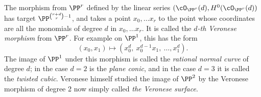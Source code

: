 %
%
%
%

\begin{example}\label{Veronese definition}
The morphism from $\PP^r$ defined by the  linear series $(\cO_{\PP^r}(d), H^0(\cO_{\PP^r}(d))$ has target
$\PP^{{r+d\choose r}-1}$, and takes a point $x_0,\dots x_r$ to the point whose coordinates are all the monomials of
degree $d$ in $x_0,\dots x_r$. It is called the \emph{$d$-th Veronese morphism} from $\PP^r$. For example on $\PP^1$, this has the form
$$
(x_0,x_1) \mapsto (x_0^d,\ x_0^{d-1}x_1,\ \dots,x_1^d).
$$
The image of $\PP^1$ under this morphism is called the \emph{rational normal curve} of degree $d$; in the case $d=2$ is the
\emph{plane conic}, and in the case $d=3$ it is called the \emph{twisted cubic}. Veronese himself studied the image of $\PP^2$
by the Veronese morphism of degree 2 now simply called \emph{the Veronese surface}.
\end{example}

